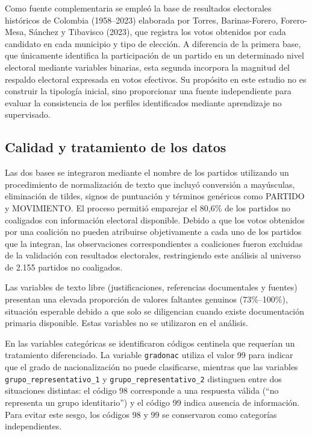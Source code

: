 \documentclass[11pt,letterpaper]{article}
\newcommand{\code}[1]{\texttt{\small #1}}
\begin{document}
Como fuente complementaria se empleó la base de resultados electorales históricos de Colombia (1958--2023) elaborada por Torres, Barinas-Forero, Forero-Mesa, Sánchez y Tibavisco (2023), que registra los votos obtenidos por cada candidato en cada municipio y tipo de elección. A diferencia de la primera base, que únicamente identifica la participación de un partido en un determinado nivel electoral mediante variables binarias, esta segunda incorpora la magnitud del respaldo electoral expresada en votos efectivos. Su propósito en este estudio no es construir la tipología inicial, sino proporcionar una fuente independiente para evaluar la consistencia de los perfiles identificados mediante aprendizaje no supervisado.

\subsection{Calidad y tratamiento de los datos}

Las dos bases se integraron mediante el nombre de los partidos utilizando un procedimiento de normalización de texto que incluyó conversión a mayúsculas, eliminación de tildes, signos de puntuación y términos genéricos como PARTIDO y MOVIMIENTO. El proceso permitió emparejar el 80,6\% de los partidos no coaligados con información electoral disponible. Debido a que los votos obtenidos por una coalición no pueden atribuirse objetivamente a cada uno de los partidos que la integran, las observaciones correspondientes a coaliciones fueron excluidas de la validación con resultados electorales, restringiendo este análisis al universo de 2.155 partidos no coaligados.

Las variables de texto libre (justificaciones, referencias documentales y fuentes) presentan una elevada proporción de valores faltantes genuinos (73\%--100\%), situación esperable debido a que solo se diligencian cuando existe documentación primaria disponible. Estas variables no se utilizaron en el análisis.

En las variables categóricas se identificaron códigos centinela que requerían un tratamiento diferenciado. La variable \code{gradonac} utiliza el valor 99 para indicar que el grado de nacionalización no puede clasificarse, mientras que las variables \code{grupo\_re\-pre\-sen\-ta\-ti\-vo\_1} y \code{grupo\_re\-pre\-sen\-ta\-ti\-vo\_2} distinguen entre dos situaciones distintas: el código 98 corresponde a una respuesta válida (``no representa un grupo identitario'') y el código 99 indica ausencia de información. Para evitar este sesgo, los códigos 98 y 99 se conservaron como categorías independientes.
\end{document}
